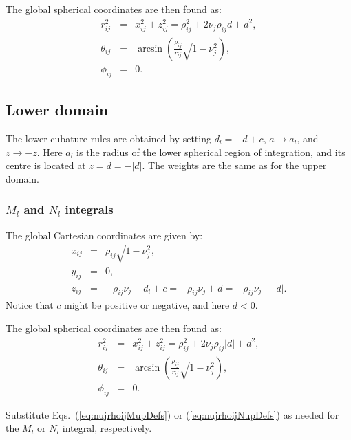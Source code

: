 \documentclass[11pt]{amsart}
\begin{document}
The global spherical coordinates are then found as:
%
\begin{subequations}
\begin{eqnarray}
	r_{ij}^2 & = & x_{ij}^2+z_{ij}^2=\rho_{ij}^2+2\nu_j\rho_{ij}d+d^2,\\
	\theta_{ij}& = & \arcsin\left(\frac{\rho_{ij}}{r_{ij}}\sqrt{1-\nu_j^2}\right),\\
	\phi_{ij} & = & 0.
\end{eqnarray}
\end{subequations}
%

\subsection{Lower domain}

The lower cubature rules are obtained by setting $d_l=-d+c$,
$a\rightarrow a_l$, and $z\rightarrow-z$. Here $a_l$ is the radius of the lower
spherical region of integration, and its centre is located at $z=d=-|d|$.
The weights are the same as for the upper domain.

\subsubsection{$M_l$ and $N_l$ integrals}
%
%
The global Cartesian coordinates are given by:
%
\begin{subequations}
\begin{eqnarray}
	x_{ij} & = & \rho_{ij}\sqrt{1-\nu_j^2},\\
	y_{ij}& = & 0,\\
	z_{ij} & = & -\rho_{ij}\nu_j-d_l+c=-\rho_{ij}\nu_j+d=-\rho_{ij}\nu_j-|d|.
\end{eqnarray}
\end{subequations}
%
Notice that $c$ might be positive or negative, and here $d<0$.

The global spherical coordinates are then found as:
%
\begin{subequations}
\begin{eqnarray}
	r_{ij}^2 & = & x_{ij}^2+z_{ij}^2=\rho_{ij}^2+2\nu_j\rho_{ij}|d|+d^2,\\
	\theta_{ij}& = & \arcsin\left(\frac{\rho_{ij}}{r_{ij}}\sqrt{1-\nu_j^2}\right),\\
	\phi_{ij} & = & 0.
\end{eqnarray}
\end{subequations}
%

Substitute Eqs.~(\ref{eq:nujrhoijMupDefs}) or (\ref{eq:nujrhoijNupDefs}) as needed for
the $M_l$ or  $N_l$ integral, respectively.
\end{document}
